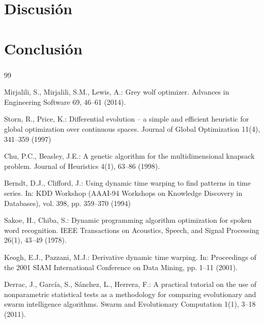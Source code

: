 \documentclass[runningheads]{llncs}
\begin{document}
\section{Discusión}

\section{Conclusión}

\begin{credits}
\subsubsection{\ackname}
\subsubsection{\discintname}
\end{credits}

\begin{thebibliography}{99}

Mirjalili, S., Mirjalili, S.M., Lewis, A.: Grey wolf optimizer. Advances in Engineering Software 69, 46--61 (2014). 

Storn, R., Price, K.: Differential evolution -- a simple and efficient heuristic for global optimization over continuous spaces. Journal of Global Optimization 11(4), 341--359 (1997)

Chu, P.C., Beasley, J.E.: A genetic algorithm for the multidimensional knapsack problem. Journal of Heuristics 4(1), 63--86 (1998). 

Berndt, D.J., Clifford, J.: Using dynamic time warping to find patterns in time series. In: KDD Workshop (AAAI-94 Workshops on Knowledge Discovery in Databases), vol. 398, pp. 359--370 (1994)

Sakoe, H., Chiba, S.: Dynamic programming algorithm optimization for spoken word recognition. IEEE Transactions on Acoustics, Speech, and Signal Processing 26(1), 43--49 (1978). 

Keogh, E.J., Pazzani, M.J.: Derivative dynamic time warping. In: Proceedings of the 2001 SIAM International Conference on Data Mining, pp. 1--11 (2001). 

Derrac, J., García, S., Sánchez, L., Herrera, F.: A practical tutorial on the use of nonparametric statistical tests as a methodology for comparing evolutionary and swarm intelligence algorithms. Swarm and Evolutionary Computation 1(1), 3--18 (2011). 

\end{thebibliography}
\end{document}
